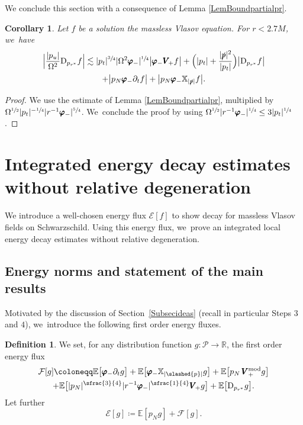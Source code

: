 \documentclass[10pt]{amsart}
\theoremstyle{plain}
\newtheorem{corollary}[proposition]{Corollary}
\theoremstyle{definition}
\newtheorem{definition}[proposition]{Definition}
\newcommand\R{{\mathbb{R}}}
\newcommand\T{{\mathbb{X}}}
\begin{document}
We conclude this section with a consequence of Lemma \ref{LemBoundpartialpr}.

\begin{corollary}\label{CorBoundpartialpr}
Let $f$ be a solution the massless Vlasov equation. For $r < 2.7M$, we~have
\begin{multline*}
\Bigl| \frac{|p_u|}{\Omega^2} \mathrm{D}_{p_{r^*}} f \Bigr| \lesssim |p_t|^{\sfrac{3}{4}}|\Omega^2 \pmb{\varphi}_-|^{\sfrac{1}{4}} \big| \pmb{\varphi}_- \pmb{V}_{\! +} f \big|+ \Bigl(|p_t|+ \frac{|\slashed{p}|^2}{|p_t|}\Bigr) \big| \mathrm{D}_{p_{r^*}} f \big| \\
+ \big| p_N \pmb{\varphi}_-\partial_t f \big|+\big| p_N \pmb{\varphi}_- \T_{|\slashed{p}|} f \big|.
\end{multline*}
\end{corollary}
\begin{proof}
We use the estimate of Lemma \ref{LemBoundpartialpr}, multiplied by $\Omega^{\sfrac{1}{2}}|p_t|^{-\sfrac{1}{4}} |r^{-1} \pmb{\varphi}_-|^{\sfrac{5}{4}}$. We~conclude the proof by using $\Omega^{\sfrac{1}{2}} |r^{-1} \pmb{\varphi}_-|^{\sfrac{1}{4}} \leq 3|p_t|^{\sfrac{1}{4}}$.
\end{proof}

\section{Integrated energy decay estimates without relative degeneration}\label{SecILEDwrd}

We introduce a well-chosen energy flux $\mathcal{E}[f]$ to show decay for massless Vlasov fields on Schwarzschild. Using this energy flux, we~prove an integrated local energy decay estimates without relative degeneration.

\subsection{Energy norms and statement of the main results}

Motivated by the discussion of Section~\ref{Subsecideas} (recall in particular Steps $3$ and $4$), we~introduce the following first order energy fluxes.

\begin{definition}
We set, for any distribution function $g : \mathcal{P} \to \R$, the first order energy flux
\begin{multline*}
\mathcal{F}[g]\coloneqq \mathbb{E} \bigl[ \pmb{\varphi}_- \partial_t g \bigr]+\mathbb{E} \bigl[ \pmb{\varphi}_- \T_{|\slashed{p}|} g \bigr] + \mathbb{E} \bigl[ p_N \, \pmb{V}_+^{ \mathrm{mod}} g \bigr]\\
+\mathbb{E} \bigl[ |p_N|^{\sfrac{3}{4}} |r^{-1} \pmb{\varphi}_-|^{\sfrac{1}{4}} \pmb{V}_{\! +} g \bigr]+\mathbb{E} \bigl[\mathrm{D}_{p_{r^*}} g \bigr].
\end{multline*}
Let further
\[
\mathcal{E}[g]\coloneqq\mathbb{E}[p_Ng]+\mathcal{F}[g].
\]
\end{definition}
\end{document}
